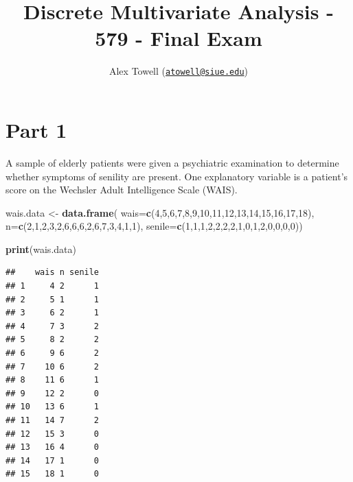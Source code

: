 \documentclass[
  11pt,
]{article}
\title{Discrete Multivariate Analysis - 579 - Final Exam}
\author{Alex Towell
(\href{mailto:atowell@siue.edu}{\nolinkurl{atowell@siue.edu}})}
\date{}
\newenvironment{Shaded}{\begin{snugshade}}{\end{snugshade}}
\newcommand{\AttributeTok}[1]{\textcolor[rgb]{0.13,0.29,0.53}{#1}}
\newcommand{\DecValTok}[1]{\textcolor[rgb]{0.00,0.00,0.81}{#1}}
\newcommand{\FunctionTok}[1]{\textcolor[rgb]{0.13,0.29,0.53}{\textbf{#1}}}
\newcommand{\NormalTok}[1]{#1}
\newcommand{\OtherTok}[1]{\textcolor[rgb]{0.56,0.35,0.01}{#1}}
\begin{document}
\maketitle

\hypertarget{part-1}{%
\section{Part 1}\label{part-1}}

A sample of elderly patients were given a psychiatric examination to
determine whether symptoms of senility are present. One explanatory
variable is a patient's score on the Wechsler Adult Intelligence Scale
(WAIS).

\begin{Shaded}
\begin{Highlighting}[]
\NormalTok{wais.data }\OtherTok{\textless{}{-}} \FunctionTok{data.frame}\NormalTok{(}
  \AttributeTok{wais=}\FunctionTok{c}\NormalTok{(}\DecValTok{4}\NormalTok{,}\DecValTok{5}\NormalTok{,}\DecValTok{6}\NormalTok{,}\DecValTok{7}\NormalTok{,}\DecValTok{8}\NormalTok{,}\DecValTok{9}\NormalTok{,}\DecValTok{10}\NormalTok{,}\DecValTok{11}\NormalTok{,}\DecValTok{12}\NormalTok{,}\DecValTok{13}\NormalTok{,}\DecValTok{14}\NormalTok{,}\DecValTok{15}\NormalTok{,}\DecValTok{16}\NormalTok{,}\DecValTok{17}\NormalTok{,}\DecValTok{18}\NormalTok{),}
  \AttributeTok{n=}\FunctionTok{c}\NormalTok{(}\DecValTok{2}\NormalTok{,}\DecValTok{1}\NormalTok{,}\DecValTok{2}\NormalTok{,}\DecValTok{3}\NormalTok{,}\DecValTok{2}\NormalTok{,}\DecValTok{6}\NormalTok{,}\DecValTok{6}\NormalTok{,}\DecValTok{6}\NormalTok{,}\DecValTok{2}\NormalTok{,}\DecValTok{6}\NormalTok{,}\DecValTok{7}\NormalTok{,}\DecValTok{3}\NormalTok{,}\DecValTok{4}\NormalTok{,}\DecValTok{1}\NormalTok{,}\DecValTok{1}\NormalTok{),}
  \AttributeTok{senile=}\FunctionTok{c}\NormalTok{(}\DecValTok{1}\NormalTok{,}\DecValTok{1}\NormalTok{,}\DecValTok{1}\NormalTok{,}\DecValTok{2}\NormalTok{,}\DecValTok{2}\NormalTok{,}\DecValTok{2}\NormalTok{,}\DecValTok{2}\NormalTok{,}\DecValTok{1}\NormalTok{,}\DecValTok{0}\NormalTok{,}\DecValTok{1}\NormalTok{,}\DecValTok{2}\NormalTok{,}\DecValTok{0}\NormalTok{,}\DecValTok{0}\NormalTok{,}\DecValTok{0}\NormalTok{,}\DecValTok{0}\NormalTok{))}

\FunctionTok{print}\NormalTok{(wais.data)}
\end{Highlighting}
\end{Shaded}

\begin{verbatim}
##    wais n senile
## 1     4 2      1
## 2     5 1      1
## 3     6 2      1
## 4     7 3      2
## 5     8 2      2
## 6     9 6      2
## 7    10 6      2
## 8    11 6      1
## 9    12 2      0
## 10   13 6      1
## 11   14 7      2
## 12   15 3      0
## 13   16 4      0
## 14   17 1      0
## 15   18 1      0
\end{verbatim}
\end{document}
